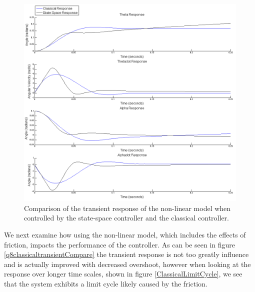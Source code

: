 \documentclass{article}
\theoremstyle{plain}
\theoremstyle{definition}
\theoremstyle{remark}
\begin{document}
\begin{figure}
\begin{center}
\includegraphics[width = 15cm]{transientNonLinear}
\end{center}
\caption{Comparison of the transient response of the non-linear model when controlled by the state-space controller and the classical controller.}
\label{q8classicalvsStateSpace}
\end{figure}

We next examine how using the non-linear model, which includes the effects of friction, impacts the performance of the controller.  As can be seen in figure \ref{q8classicaltransientCompare} the transient response is not too greatly influence and is actually improved with decreased overshoot, however when looking at the response over longer time scales, shown in figure \ref{ClassicalLimitCycle}, we see that the system exhibits a limit cycle likely caused by the friction.  
\end{document}
